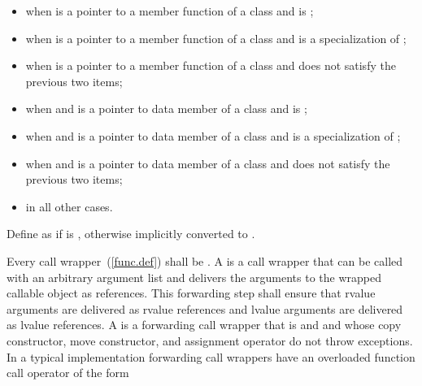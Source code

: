 \begin{itemize}
\item {} when  is a pointer to a
member function of a class 
and  is ;

\item {} when  is a pointer to a
member function of a class 
and  is a specialization of ;

\item {} when  is a pointer to a
member function of a class 
and  does not satisfy the previous two items;

\item {} when  and  is a pointer to
data member of a class 
and  is ;
    
\item {} when  and  is a pointer to
data member of a class 
and  is a specialization of ;

\item {} when  and  is a pointer to
data member of a class 
and  does not satisfy the previous two items;

\item {} in all other cases.
\end{itemize}

\pnum
{}%
Define  as
if  is \cv{} , otherwise
 implicitly converted
to .

\pnum
{}%
%
%
%
%
Every call wrapper~(\ref{func.def}) shall be
.
A  is a
call wrapper that can be called with an arbitrary argument list
and delivers the arguments to the wrapped callable object as references.
This forwarding step shall ensure that rvalue arguments are delivered as rvalue references
and lvalue arguments are delivered as lvalue references.
A  is a forwarding call wrapper that is
 and  and
whose copy constructor, move constructor, and assignment operator
do not throw exceptions.
\enternote In a typical implementation
forwarding call wrappers have an overloaded function call
operator of
the form

